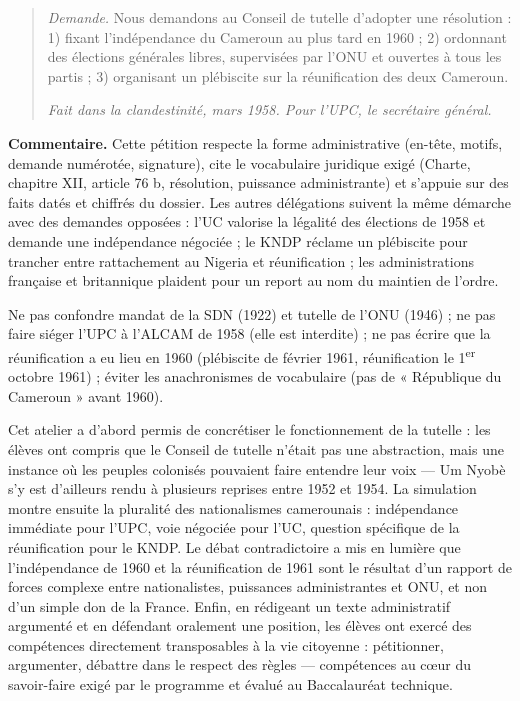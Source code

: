 \documentclass[11pt]{article}
\newcommand{\cle}[1]{{\popxbold\color{popdark}#1}}
\newcounter{popsec}
\newcounter{popsub}
\newcommand{\courssub}[1]{%
  \stepcounter{popsub}%
  \par\vspace{9pt}\noindent{\popxbold\fontsize{11.5}{13}\selectfont\color{popink}{\color{poporange}\thepopsec.\thepopsub}\hspace{6pt}#1}\par\nopagebreak\vspace{4pt}
}
\begin{document}
\begin{exoresolu}
\begin{quote}
\textit{Demande.} Nous demandons au Conseil de tutelle d'adopter une résolution : 1) fixant l'indépendance du Cameroun au plus tard en 1960 ; 2) ordonnant des élections générales libres, supervisées par l'ONU et ouvertes à tous les partis ; 3) organisant un plébiscite sur la réunification des deux Cameroun.

\textit{Fait dans la clandestinité, mars 1958. Pour l'UPC, le secrétaire général.}
\end{quote}

\textbf{Commentaire.} Cette pétition respecte la forme administrative (en-tête, motifs, demande numérotée, signature), cite le vocabulaire juridique exigé (Charte, chapitre XII, article 76 b, résolution, puissance administrante) et s'appuie sur des faits datés et chiffrés du dossier. Les autres délégations suivent la même démarche avec des demandes opposées : l'UC valorise la légalité des élections de 1958 et demande une indépendance négociée ; le KNDP réclame un plébiscite pour trancher entre rattachement au Nigeria et réunification ; les administrations française et britannique plaident pour un report au nom du maintien de l'ordre.
\end{exoresolu}

\begin{attention}
Ne pas confondre mandat de la SDN (1922) et tutelle de l'ONU (1946) ; ne pas faire siéger l'UPC à l'ALCAM de 1958 (elle est interdite) ; ne pas écrire que la réunification a eu lieu en 1960 (plébiscite de février 1961, réunification le 1\textsuperscript{er} octobre 1961) ; éviter les anachronismes de vocabulaire (pas de « République du Cameroun » avant 1960).
\end{attention}

\courssub{Bilan de l'activité}

Cet atelier a d'abord permis de \cle{concrétiser le fonctionnement de la tutelle} : les élèves ont compris que le Conseil de tutelle n'était pas une abstraction, mais une instance où les peuples colonisés pouvaient faire entendre leur voix — Um Nyobè s'y est d'ailleurs rendu à plusieurs reprises entre 1952 et 1954. La simulation montre ensuite la \cle{pluralité des nationalismes camerounais} : indépendance immédiate pour l'UPC, voie négociée pour l'UC, question spécifique de la réunification pour le KNDP. Le débat contradictoire a mis en lumière que l'indépendance de 1960 et la réunification de 1961 sont le résultat d'un rapport de forces complexe entre nationalistes, puissances administrantes et ONU, et non d'un simple don de la France. Enfin, en rédigeant un texte administratif argumenté et en défendant oralement une position, les élèves ont exercé des compétences directement transposables à la vie citoyenne : pétitionner, argumenter, débattre dans le respect des règles — compétences au cœur du savoir-faire exigé par le programme et évalué au Baccalauréat technique.
\end{document}
